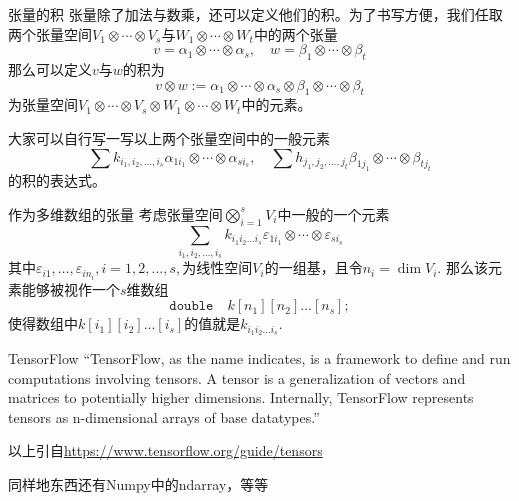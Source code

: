 
\begin{frame}

\begin{block}{张量的积}
张量除了加法与数乘，还可以定义他们的积。为了书写方便，我们任取两个张量空间$V_1\otimes\cdots\otimes V_s$与$W_1\otimes\cdots\otimes W_t$中的两个张量
$$v = \alpha_1\otimes\cdots\otimes \alpha_s, \quad w = \beta_1\otimes\cdots\otimes \beta_t$$
那么可以定义$v$与$w$的积为
$$v\otimes w := \alpha_1\otimes\cdots\otimes \alpha_s \otimes \beta_1\otimes\cdots\otimes \beta_t$$
为张量空间$V_1\otimes\cdots\otimes V_s\otimes W_1\otimes\cdots\otimes W_t$中的元素。

\vspace{2em}
\pause

大家可以自行写一写以上两个张量空间中的一般元素
$$\sum k_{i_1,i_2,\ldots,i_s}\alpha_{1i_1} \otimes \cdots \otimes \alpha_{si_s}, \quad \sum h_{j_1,j_2,\ldots,j_t}\beta_{1j_1} \otimes \cdots \otimes \beta_{tj_t}$$
的积的表达式。
\end{block}

\end{frame}


\begin{frame}

\begin{block}{作为多维数组的张量}
考虑张量空间$\bigotimes\limits_{i=1}^s V_i$中一般的一个元素
$$\sum\limits_{i_1,i_2,\ldots,i_s} k_{i_1i_2\ldots i_s} \varepsilon_{1i_1} \otimes \cdots \otimes \varepsilon_{si_s}$$
其中$\varepsilon_{i1},\ldots,\varepsilon_{in_i}, i=1,2,\ldots,s,$为线性空间$V_i $的一组基，且令$n_i = \dim V_i$. 那么该元素能够被视作一个$s$维数组
$$
\texttt{double} \quad k[n_1][n_2]...[n_s];
$$
使得数组中$k[i_1][i_2]...[i_s]$的值就是$k_{i_1i_2\ldots i_s}$.
\end{block}

\end{frame}


\begin{frame}

\begin{block}{\Large TensorFlow}
\vspace{1em}
{
\large
``TensorFlow, as the name indicates, is a framework to define and run computations involving tensors. A tensor is a generalization of vectors and matrices to potentially higher dimensions. Internally, TensorFlow represents tensors as n-dimensional arrays of base datatypes.''
}

\vspace{1em}

以上引自\href{https://www.tensorflow.org/guide/tensors}{https://www.tensorflow.org/guide/tensors}

\vspace{2em}
\pause

同样地东西还有Numpy中的ndarray，等等
\end{block}

\end{frame}


